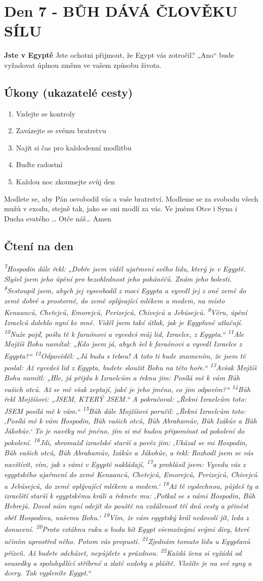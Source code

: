 \documentclass[11pt]{article}
\newcommand{\zacatekPrvniTyden}{
  \textbf{Jste v Egyptě} \newline
  Jste ochotni přijmout, že Egypt vás zotročil? „Ano“ bude vyžadovat úplnou změnu ve vašem způsobu života.

\subsection*{Úkony (ukazatelé cesty)}
\begin{enumerate}
  \item Vzdejte se kontroly
  \item Zavázejte se svému bratrstvu
  \item Najít si čas pro každodenní modlitbu
  \item Buďte radostní
  \item Každou noc zkoumejte svůj den
\end{enumerate}
Modlete se, aby Pán osvobodil vás a vaše bratrství. \newline
Modleme se za svobodu všech mužů v exodu, stejně tak, jako se oni modlí za vás.\newline
Ve jménu Otce i Syna i Ducha svatého …  Otče náš… Amen
}
\begin{document}
\newpage
\section{Den 7 - BŮH DÁVÁ ČLOVĚKU SÍLU}
\zacatekPrvniTyden
\subsection*{Čtení na den}
\textbf{}
\newline
\textit{
\textsuperscript{7}Hospodin dále řekl: „Dobře jsem viděl ujařmení svého lidu, který je v Egyptě. Slyšel jsem jeho úpění pro bezohlednost jeho poháněčů. Znám jeho bolesti.
\textsuperscript{8}Sestoupil jsem, abych jej vysvobodil z moci Egypta a vyvedl jej z oné země do země dobré a prostorné, do země oplývající mlékem a medem, na místo Kenaanců, Chetejců, Emorejců, Perizejců, Chivejců a Jebúsejců.
\textsuperscript{9}Věru, úpění Izraelců dolehlo nyní ke mně. Viděl jsem také útlak, jak je Egypťané utlačují.
\textsuperscript{10}Nuže pojď, pošlu tě k faraónovi a vyvedeš můj lid, Izraelce, z Egypta.“
\textsuperscript{11}Ale Mojžíš Bohu namítal: „Kdo jsem já, abych šel k faraónovi a vyvedl Izraelce z Egypta?“
\textsuperscript{12}Odpověděl: „Já budu s tebou! A toto ti bude znamením, že jsem tě poslal: Až vyvedeš lid z Egypta, budete sloužit Bohu na této hoře.“
\textsuperscript{13}Avšak Mojžíš Bohu namítl: „Hle, já přijdu k Izraelcům a řeknu jim: Posílá mě k vám Bůh vašich otců. Až se mě však zeptají, jaké je jeho jméno, co jim odpovím?“
\textsuperscript{14}Bůh řekl Mojžíšovi: „JSEM, KTERÝ JSEM.“ A pokračoval: „Řekni Izraelcům toto: JSEM posílá mě k vám.“
\textsuperscript{15}Bůh dále Mojžíšovi poručil: „Řekni Izraelcům toto: ‚Posílá mě k vám Hospodin, Bůh vašich otců, Bůh Abrahamův, Bůh Izákův a Bůh Jákobův.‘ To je navěky mé jméno, jím si mě budou připomínat od pokolení do pokolení.
\textsuperscript{16}Jdi, shromažď izraelské starší a pověz jim: ,Ukázal se mi Hospodin, Bůh vašich otců, Bůh Abrahamův, Izákův a Jákobův, a řekl: Rozhodl jsem se vás navštívit, vím, jak s vámi v Egyptě nakládají,
\textsuperscript{17}a prohlásil jsem: Vyvedu vás z egyptského ujařmení do země Kenaanců, Chetejců, Emorejců, Perizejců, Chivejců a Jebúsejců, do země oplývající mlékem a medem.‘
\textsuperscript{18}Až tě vyslechnou, půjdeš ty a izraelští starší k egyptskému králi a řeknete mu: ‚Potkal se s námi Hospodin, Bůh Hebrejů. Dovol nám nyní odejít do pouště na vzdálenost tří dnů cesty a přinést oběť Hospodinu, našemu Bohu.‘
\textsuperscript{19}Vím, že vám egyptský král nedovolí jít, leda z donucení.
\textsuperscript{20}Proto vztáhnu ruku a budu bít Egypt všemožnými svými divy, které učiním uprostřed něho. Potom vás propustí.
\textsuperscript{21}Zjednám tomuto lidu u Egypťanů přízeň. Až budete odcházet, nepůjdete s prázdnou.
\textsuperscript{22}Každá žena si vyžádá od sousedky a spolubydlící stříbrné a zlaté ozdoby a pláště. Vložíte je na své syny a dcery. Tak vypleníte Egypt.“
}
\end{document}
